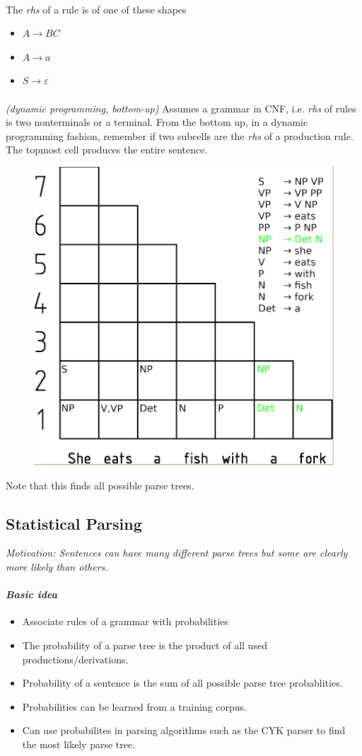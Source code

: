 \documentclass[10pt,twocolumn]{article}
\begin{document}
\paragraph{} The \textit{rhs} of a rule is of one of
these shapes
\begin{itemize}
\item $A \rightarrow BC$
\item $A \rightarrow a$
\item $S \rightarrow \varepsilon$
\end{itemize}


\paragraph{ } \textit{(dynamic programming, bottom-up)} Assumes
a grammar in CNF, i.e. \textit{rhs} of rules is two nonterminals or a terminal.
From the bottom up, in a dynamic programming fashion, remember if two subcells
are the \textit{rhs} of a production rule. The topmost cell produces the entire sentence.
\begin{figure}
  \centering
  \includegraphics[width=0.4\linewidth]{cyk-parsing}
\end{figure}
Note that this finds all possible parse trees.

\subsection{Statistical Parsing}

\textit{Motivation: Sentences can have many different parse trees but some are
  clearly more likely than others.}

\paragraph{\textit{Basic idea}}
\begin{itemize}
\item Associate rules of a grammar with probabilities
\item The probability of a parse tree is the product of all used
  productions/derivations.
\item Probability of a sentence is the sum of all possible parse tree
  probablities.
\item Probabilities can be learned from a training corpus.
\item Can use probabilites in parsing algorithms such as the CYK parser to find
  the most likely parse tree.
\end{itemize}
\end{document}
